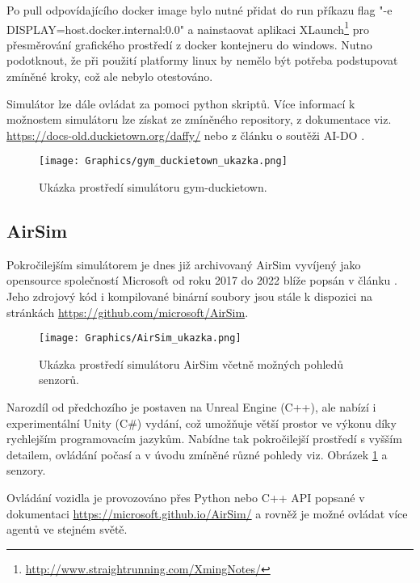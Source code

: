 \documentclass[czech, bc, kky, he, iso690alph]{fasthesis}
\begin{document}
    			Po pull odpovídajícího docker image bylo nutné přidat do run příkazu flag 
    			\command"-e DISPLAY=host.docker.internal:0.0" a nainstaovat aplikaci XLaunch\footnote{\href{http://www.straightrunning.com/XmingNotes/}{http://www.straightrunning.com/XmingNotes/}} pro přesměrování grafického prostředí z docker kontejneru do windows. Nutno podotknout, že při použití platformy linux by nemělo být potřeba podstupovat zmíněné kroky, což ale nebylo otestováno.
    			
    			Simulátor lze dále ovládat za pomoci python skriptů. Více informací k možnostem simulátoru lze získat ze zmíněného repository, z dokumentace viz. \href{https://docs-old.duckietown.org/daffy/}{https://docs-old.duckietown.org/daffy/} nebo z článku o soutěži AI-DO \cite{AI-DO}.
	    			\begin{figure}[h]
	    				\centering
	    				\texttt{[image: Graphics/gym\_duckietown\_ukazka.png]}
	    				\caption{Ukázka prostředí simulátoru gym-duckietown.}
	    			\end{figure}
    			
    		\subsection{AirSim}
    			Pokročilejším simulátorem je dnes již archivovaný AirSim vyvíjený jako opensource společností Microsoft od roku 2017 do 2022 blíže popsán v článku \cite{airsim_paper}. Jeho zdrojový kód i kompilované binární soubory jsou stále k dispozici na stránkách \href{https://github.com/microsoft/AirSim}{https://github.com/microsoft/AirSim}.
    			
    				\begin{figure}[h]
	    				\centering
	    				\texttt{[image: Graphics/AirSim\_ukazka.png]}
	    				\caption{Ukázka prostředí simulátoru AirSim včetně možných pohledů senzorů.}
	    				\label{pic:AirSim_ukazka}
	    			\end{figure}
    			
    			Narozdíl od předchozího je postaven na Unreal Engine (C++), ale nabízí i experimentální Unity (C\#) vydání, což umožňuje větší prostor ve výkonu díky rychlejším programovacím jazykům. Nabídne tak pokročilejší prostředí s vyšším detailem, ovládání počasí a v úvodu zmíněné různé pohledy viz. Obrázek \ref{pic:AirSim_ukazka} a senzory.
    			
    			Ovládání vozidla je provozováno přes Python nebo C++ API popsané v dokumentaci \href{https://microsoft.github.io/AirSim/}{https://microsoft.github.io/AirSim/} a rovněž je možné ovládat více agentů ve stejném světě.
	    		
\end{document}
